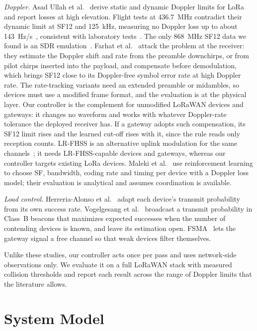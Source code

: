 \documentclass[journal]{IEEEtran}
\begin{document}
\emph{Doppler.} Asad Ullah et al.~\cite{asadullah2024} derive static and dynamic Doppler limits for LoRa and report losses at high elevation. Flight tests at 436.7~MHz contradict their dynamic limit at SF12 and 125~kHz, measuring no Doppler loss up to about 143~Hz/s~\cite{zadorozhny2022}, consistent with laboratory tests~\cite{doroshkin2019}. The only 868~MHz SF12 data we found is an SDR emulation~\cite{colombo2022}. Farhat et al.~\cite{farhat2025} attack the problem at the receiver: they estimate the Doppler shift and rate from the preamble downchirps, or from pilot chirps inserted into the payload, and compensate before demodulation, which brings SF12 close to its Doppler-free symbol error rate at high Doppler rate. The rate-tracking variants need an extended preamble or midambles, so devices must use a modified frame format, and the evaluation is at the physical layer. Our controller is the complement for unmodified LoRaWAN devices and gateways: it changes no waveform and works with whatever Doppler-rate tolerance the deployed receiver has. If a gateway adopts such compensation, its SF12 limit rises and the learned cut-off rises with it, since the rule reads only reception counts. LR-FHSS is an alternative uplink modulation for the same channels~\cite{santana2026}; it needs LR-FHSS-capable devices and gateways, whereas our controller targets existing LoRa devices. Maleki et al.~\cite{maleki2026} use reinforcement learning to choose SF, bandwidth, coding rate and timing per device with a Doppler loss model; their evaluation is analytical and assumes coordination is available.

\emph{Load control.} Herreria-Alonso et al.~\cite{herreria2023} adapt each device's transmit probability from its own success rate. Vogelgesang et al.~\cite{vogelgesang2021} broadcast a transmit probability in Class~B beacons that maximizes expected successes when the number of contending devices is known, and leave its estimation open. FSMA~\cite{fsma2026} lets the gateway signal a free channel so that weak devices filter themselves.

Unlike these studies, our controller acts once per pass and uses network-side observations only. We evaluate it on a full LoRaWAN stack with measured collision thresholds and report each result across the range of Doppler limits that the literature allows.

\section{System Model}\label{sec:model}
\end{document}
